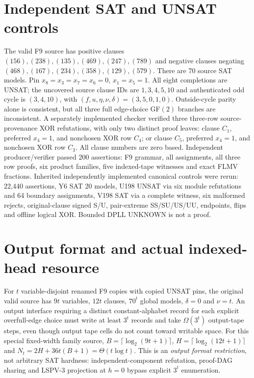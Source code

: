 \documentclass[10pt]{article}
\begin{document}
\section{Independent SAT and UNSAT controls}
The valid F9 source has positive clauses $(156),(238),(135),(469),(247),(789)$ and negative clauses negating $(468),(167),(234),(358),(129),(579)$. There are 70 source SAT models. Pin $x_8=x_3=x_7=x_6=0$, $x_1=x_5=1$. All eight completions are UNSAT; the uncovered source clause IDs are $1,3,4,5,10$ and authenticated odd cycle is $(3,4,10)$, with $(f,u,\eta,\nu,\delta)=(3,5,0,1,0)$. Outside-cycle parity alone is consistent, but all three full edge-choice GF$(2)$ branches are inconsistent. A separately implemented checker verified three three-row source-provenance XOR refutations, with only two distinct proof leaves: clause $C_1$, preferred $x_4=1$, and nonchosen XOR row $C_4$; or clause $C_5$, preferred $x_4=1$, and nonchosen XOR row $C_3$. All clause numbers are zero based. Independent producer/verifier passed 200 assertions: F9 grammar, all assignments, all three row proofs, six product families, five indexed-tape witnesses and exact FLMV fractions. Inherited independently implemented canonical controls were rerun: 22,440 assertions, Y6 SAT 20 models, U198 UNSAT via six module refutations and 64 boundary assignments, V198 SAT via a complete witness, six malformed rejects, original-clause signed S/U, pair-extreme SS/SU/US/UU, endpoints, flips and offline logical XOR. Bounded DPLL UNKNOWN is not a proof.

\section{Output format and actual indexed-head resource}
For $t$ variable-disjoint renamed F9 copies with copied UNSAT pins, the original valid source has $9t$ variables, $12t$ clauses, $70^t$ global models, $\delta=0$ and $\nu=t$. An output interface requiring a distinct constant-alphabet record for each explicit overfull-edge choice must write at least $3^t$ records and take $\Omega(3^t)$ output-tape steps, even though output tape cells do not count toward writable space. For this special fixed-width family source, $B=\lceil\log_2(9t+1)\rceil$, $H=\lceil\log_2(12t+1)\rceil$ and $N_t=2H+36t(B+1)=\Theta(t\log t)$. This is an \emph{output format restriction}, not arbitrary SAT hardness: independent-component refutation, proof-DAG sharing and LSPV-3 projection at $h=0$ bypass explicit $3^t$ enumeration.
\end{document}
